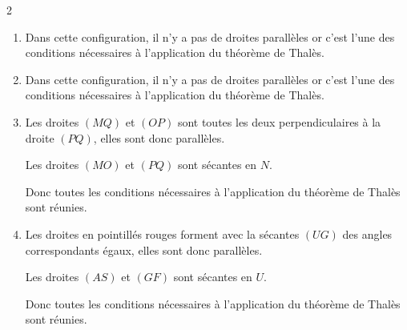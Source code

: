 \begin{corrige}
    \phantom{rrr}    
    \begin{multicols}2
        \begin{enumerate}
            \item Dans cette configuration, il n'y a pas de droites parallèles or c'est l'une
            des conditions nécessaires à l'application du théorème de Thalès.
            \item Dans cette configuration, il n'y a pas de droites parallèles or c'est l'une
            des conditions nécessaires à l'application du théorème de Thalès.
            \item Les droites $(MQ)$ et $(OP)$ sont toutes les deux perpendiculaires à la droite $(PQ)$, elles sont donc parallèles.
            
            Les droites $(MO)$ et $(PQ)$ sont sécantes en $N$.

            Donc toutes les conditions nécessaires à l'application du théorème de Thalès sont réunies.
            \item Les droites en pointillés rouges forment avec la sécantes $(UG)$ des angles
            correspondants égaux, elles sont donc parallèles.

            Les droites $(AS)$ et $(GF)$ sont sécantes en $U$.

            Donc toutes les conditions nécessaires à l'application du théorème de Thalès sont réunies.
        \end{enumerate}
    \end{multicols}
\end{corrige}

